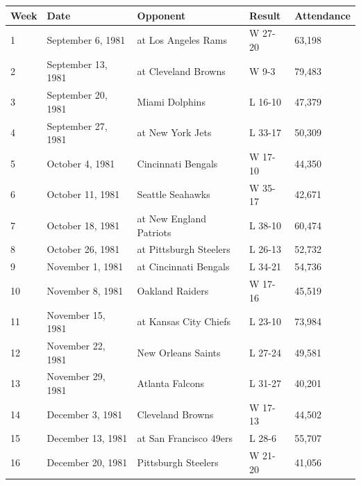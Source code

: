 \documentclass{article}
\begin{document}
\begin{tabular}{lllll}
\toprule
Week & Date & Opponent & Result & Attendance \\
\midrule
1 & September 6, 1981 & at Los Angeles Rams & W 27-20 & 63,198 \\
2 & September 13, 1981 & at Cleveland Browns & W 9-3 & 79,483 \\
3 & September 20, 1981 & Miami Dolphins & L 16-10 & 47,379 \\
4 & September 27, 1981 & at New York Jets & L 33-17 & 50,309 \\
5 & October 4, 1981 & Cincinnati Bengals & W 17-10 & 44,350 \\
6 & October 11, 1981 & Seattle Seahawks & W 35-17 & 42,671 \\
7 & October 18, 1981 & at New England Patriots & L 38-10 & 60,474 \\
8 & October 26, 1981 & at Pittsburgh Steelers & L 26-13 & 52,732 \\
9 & November 1, 1981 & at Cincinnati Bengals & L 34-21 & 54,736 \\
10 & November 8, 1981 & Oakland Raiders & W 17-16 & 45,519 \\
11 & November 15, 1981 & at Kansas City Chiefs & L 23-10 & 73,984 \\
12 & November 22, 1981 & New Orleans Saints & L 27-24 & 49,581 \\
13 & November 29, 1981 & Atlanta Falcons & L 31-27 & 40,201 \\
14 & December 3, 1981 & Cleveland Browns & W 17-13 & 44,502 \\
15 & December 13, 1981 & at San Francisco 49ers & L 28-6 & 55,707 \\
16 & December 20, 1981 & Pittsburgh Steelers & W 21-20 & 41,056 \\
\bottomrule
\end{tabular}
\end{document}
